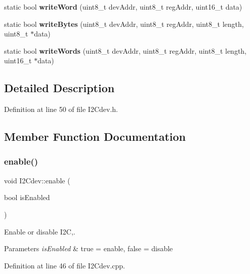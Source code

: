 \begin{DoxyCompactItemize}
static bool {\bfseries write\+Word} (uint8\+\_\+t dev\+Addr, uint8\+\_\+t reg\+Addr, uint16\+\_\+t data)
\item 
\mbox{\label{classI2Cdev_aa4e39cac6c0eac5112f9132084bcc93e}} 
static bool {\bfseries write\+Bytes} (uint8\+\_\+t dev\+Addr, uint8\+\_\+t reg\+Addr, uint8\+\_\+t length, uint8\+\_\+t $\ast$data)
\item 
\mbox{\label{classI2Cdev_aae37c0526e4b4730a5b2ffd752fd8b21}} 
static bool {\bfseries write\+Words} (uint8\+\_\+t dev\+Addr, uint8\+\_\+t reg\+Addr, uint8\+\_\+t length, uint16\+\_\+t $\ast$data)
\end{DoxyCompactItemize}


\subsection{Detailed Description}


Definition at line 50 of file I2\+Cdev.\+h.



\subsection{Member Function Documentation}
\mbox{\label{classI2Cdev_ab1fc6fb228f54f717cf317646a5751fc}} 
\subsubsection{\texorpdfstring{enable()}{enable()}}
{\footnotesize\ttfamily void I2\+Cdev\+::enable (\begin{DoxyParamCaption}\item[{bool}]{is\+Enabled }\end{DoxyParamCaption})\hspace{0.3cm}{\ttfamily [static]}}



Enable or disable I2C,. 


\begin{DoxyParams}{Parameters}
{\em is\+Enabled} & true = enable, false = disable \\
\hline
\end{DoxyParams}


Definition at line 46 of file I2\+Cdev.\+cpp.

